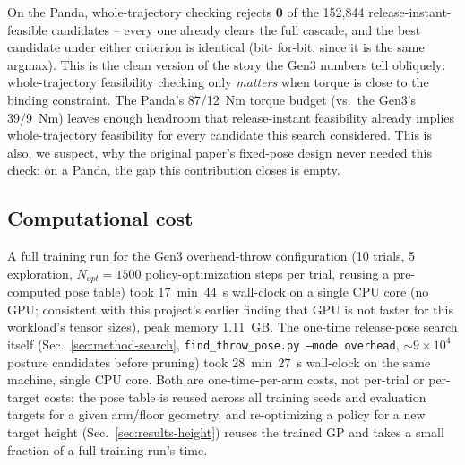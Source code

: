 \documentclass[conference]{IEEEtran}
\begin{document}
On the Panda, whole-trajectory checking rejects \textbf{0} of the 152{,}844
release-instant-feasible candidates -- every one already clears the full
cascade, and the best candidate under either criterion is identical (bit-
for-bit, since it is the same argmax). This is the clean version of the
story the Gen3 numbers tell obliquely: whole-trajectory feasibility
checking only \emph{matters} when torque is close to the binding
constraint. The Panda's 87/12~Nm torque budget (vs.\ the Gen3's 39/9~Nm)
leaves enough headroom that release-instant feasibility already implies
whole-trajectory feasibility for every candidate this search considered.
This is also, we suspect, why the original paper's fixed-pose design never
needed this check: on a Panda, the gap this contribution closes is empty.

\subsection{Computational cost}
\label{sec:results-cost}
A full training run for the Gen3 overhead-throw configuration (10 trials,
5 exploration, $N_{opt}=1500$ policy-optimization steps per trial,
reusing a pre-computed pose table) took 17~min~44~s wall-clock on a single
CPU core (no GPU; consistent with this project's earlier finding that GPU
is not faster for this workload's tensor sizes), peak memory 1.11~GB.
The one-time release-pose search itself (Sec.~\ref{sec:method-search},
\texttt{find\_throw\_pose.py --mode overhead}, $\sim\!9\times10^4$ posture
candidates before pruning) took 28~min~27~s wall-clock on the same
machine, single CPU core. Both are one-time-per-arm costs, not per-trial or per-target
costs: the pose table is reused across all training seeds and evaluation
targets for a given arm/floor geometry, and re-optimizing a policy for a
new target height (Sec.~\ref{sec:results-height}) reuses the trained GP and
takes a small fraction of a full training run's time.
\end{document}
